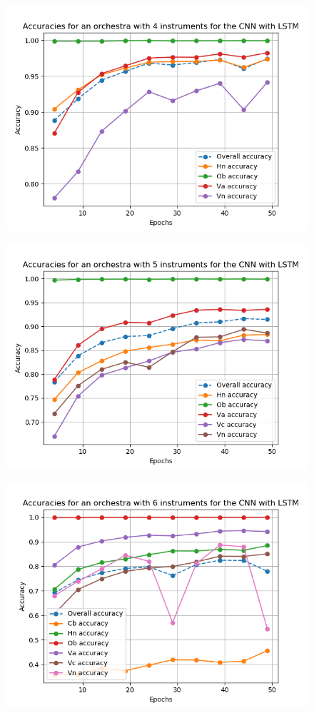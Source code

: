 \documentclass{article}
\begin{document}
\begin{figure}
\includegraphics[scale=0.6]{figs/CNN4.png}
\end{figure}
\begin{figure}
\includegraphics[scale=0.6]{figs/CNN5.png}
\end{figure}
\begin{figure}
\includegraphics[scale=0.6]{figs/CNN6.png}
\end{figure}
\end{document}
